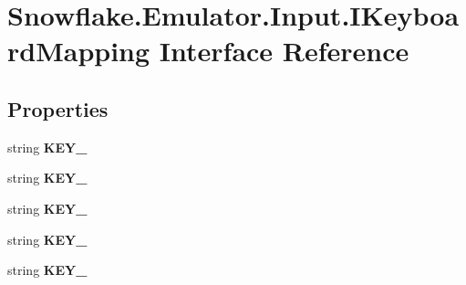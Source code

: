 \hypertarget{interface_snowflake_1_1_emulator_1_1_input_1_1_i_keyboard_mapping}{}\section{Snowflake.\+Emulator.\+Input.\+I\+Keyboard\+Mapping Interface Reference}
\label{interface_snowflake_1_1_emulator_1_1_input_1_1_i_keyboard_mapping}
\subsection*{Properties}
\begin{DoxyCompactItemize}
\item 
\hypertarget{interface_snowflake_1_1_emulator_1_1_input_1_1_i_keyboard_mapping_a55e290594e844cfd44481b51cf0312cd}{}string {\bfseries K\+E\+Y\+\_}\label{interface_snowflake_1_1_emulator_1_1_input_1_1_i_keyboard_mapping_a55e290594e844cfd44481b51cf0312cd}

\item 
\hypertarget{interface_snowflake_1_1_emulator_1_1_input_1_1_i_keyboard_mapping_a99e2ef878e5b85b0a1ffd0d738862193}{}string {\bfseries K\+E\+Y\+\_}\label{interface_snowflake_1_1_emulator_1_1_input_1_1_i_keyboard_mapping_a99e2ef878e5b85b0a1ffd0d738862193}

\item 
\hypertarget{interface_snowflake_1_1_emulator_1_1_input_1_1_i_keyboard_mapping_ab64b0711a45e969d90f0b61b8e91b6dc}{}string {\bfseries K\+E\+Y\+\_}\label{interface_snowflake_1_1_emulator_1_1_input_1_1_i_keyboard_mapping_ab64b0711a45e969d90f0b61b8e91b6dc}

\item 
\hypertarget{interface_snowflake_1_1_emulator_1_1_input_1_1_i_keyboard_mapping_afc281478809286deea47439dfd678500}{}string {\bfseries K\+E\+Y\+\_}\label{interface_snowflake_1_1_emulator_1_1_input_1_1_i_keyboard_mapping_afc281478809286deea47439dfd678500}

\item 
\hypertarget{interface_snowflake_1_1_emulator_1_1_input_1_1_i_keyboard_mapping_a33687868d58bae2cbde73486a92f64c4}{}string {\bfseries K\+E\+Y\+\_}\label{interface_snowflake_1_1_emulator_1_1_input_1_1_i_keyboard_mapping_a33687868d58bae2cbde73486a92f64c4}


\end{DoxyCompactItemize}
